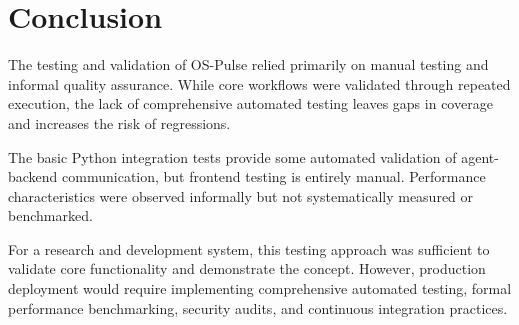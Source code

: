 
\section{Conclusion}

The testing and validation of OS-Pulse relied primarily on manual testing and informal quality assurance. While core workflows were validated through repeated execution, the lack of comprehensive automated testing leaves gaps in coverage and increases the risk of regressions.

The basic Python integration tests provide some automated validation of agent-backend communication, but frontend testing is entirely manual. Performance characteristics were observed informally but not systematically measured or benchmarked.

For a research and development system, this testing approach was sufficient to validate core functionality and demonstrate the concept. However, production deployment would require implementing comprehensive automated testing, formal performance benchmarking, security audits, and continuous integration practices.